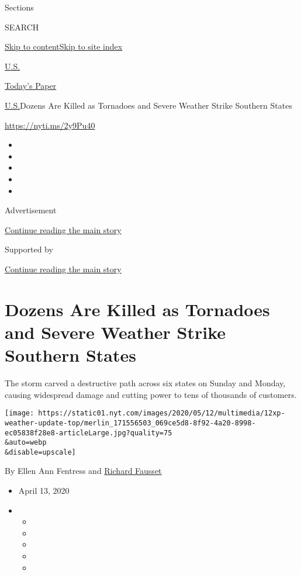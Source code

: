 Sections

SEARCH

\protect\hyperlink{site-content}{Skip to
content}\protect\hyperlink{site-index}{Skip to site index}

\href{https://www.nytimes.com/section/us}{U.S.}

\href{https://myaccount.nytimes.com/auth/login?response_type=cookie\&client_id=vi}{}

\href{https://www.nytimes.com/section/todayspaper}{Today's Paper}

\href{/section/us}{U.S.}\textbar{}Dozens Are Killed as Tornadoes and
Severe Weather Strike Southern States

\url{https://nyti.ms/2y9Pu40}

\begin{itemize}
\item
\item
\item
\item
\item
\end{itemize}

Advertisement

\protect\hyperlink{after-top}{Continue reading the main story}

Supported by

\protect\hyperlink{after-sponsor}{Continue reading the main story}

\hypertarget{dozens-are-killed-as-tornadoes-and-severe-weather-strike-southern-states}{%
\section{Dozens Are Killed as Tornadoes and Severe Weather Strike
Southern
States}\label{dozens-are-killed-as-tornadoes-and-severe-weather-strike-southern-states}}

The storm carved a destructive path across six states on Sunday and
Monday, causing widespread damage and cutting power to tens of thousands
of customers.

\texttt{[image: https://static01.nyt.com/images/2020/05/12/multimedia/12xp-weather-update-top/merlin\_171556503\_069ce5d8-8f92-4a20-8998-ec05838f28e8-articleLarge.jpg?quality=75\\\&auto=webp\\\&disable=upscale]}

By Ellen Ann Fentress and
\href{https://www.nytimes.com/by/richard-fausset}{Richard Fausset}

\begin{itemize}
\item
  April 13, 2020
\item
  \begin{itemize}
  \item
  \item
  \item
  \item
  \item
  \end{itemize}
\end{itemize}

